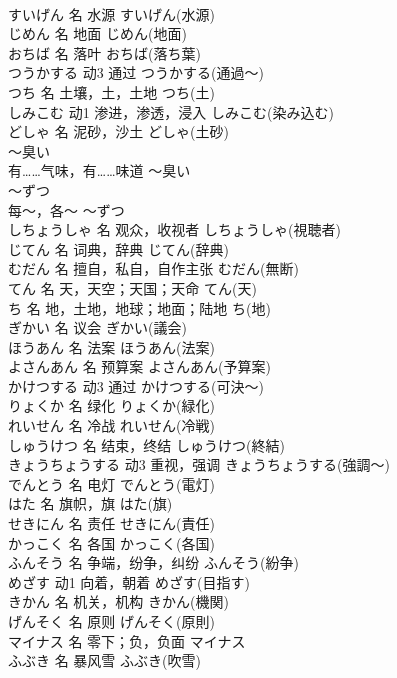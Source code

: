 \documentclass[8pt]{extreport}
\begin{document}
\begin{CJK}{UTF8}{min}
\\	すいげん	名	水源	すいげん(水源)	
\\	じめん	名	地面	じめん(地面)	
\\	おちば	名	落叶	おちば(落ち葉)	
\\	つうかする	动3	通过	つうかする(通過～)	
\\	つち	名	土壤，土，土地	つち(土)	
\\	しみこむ	动1	渗进，渗透，浸入	しみこむ(染み込む)	
\\	どしゃ	名	泥砂，沙土	どしゃ(土砂)	
\\	～臭い	
\\	有……气味，有……味道	～臭い	
\\	～ずつ	
\\	每～，各～	～ずつ	
\\	しちょうしゃ	名	观众，收视者	しちょうしゃ(視聴者)	
\\	じてん	名	词典，辞典	じてん(辞典)	
\\	むだん	名	擅自，私自，自作主张	むだん(無断)	
\\	てん	名	天，天空；天国；天命	てん(天)	
\\	ち	名	地，土地，地球；地面；陆地	ち(地)	
\\	ぎかい	名	议会	ぎかい(議会)	
\\	ほうあん	名	法案	ほうあん(法案)	
\\	よさんあん	名	预算案	よさんあん(予算案)	
\\	かけつする	动3	通过	かけつする(可決～)	
\\	りょくか	名	绿化	りょくか(緑化)	
\\	れいせん	名	冷战	れいせん(冷戦)	
\\	しゅうけつ	名	结束，终结	しゅうけつ(終結)	
\\	きょうちょうする	动3	重视，强调	きょうちょうする(強調～)	
\\	でんとう	名	电灯	でんとう(電灯)	
\\	はた	名	旗帜，旗	はた(旗)	
\\	せきにん	名	责任	せきにん(責任)	
\\	かっこく	名	各国	かっこく(各国)	
\\	ふんそう	名	争端，纷争，纠纷	ふんそう(紛争)	
\\	めざす	动1	向着，朝着	めざす(目指す)	
\\	きかん	名	机关，机构	きかん(機関)	
\\	げんそく	名	原则	げんそく(原則)	
\\	マイナス	名	零下；负，负面	マイナス	
\\	ふぶき	名	暴风雪	ふぶき(吹雪)	

\end{CJK}
\end{document}
